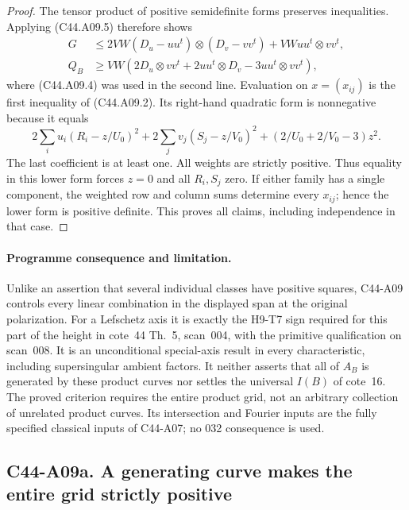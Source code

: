 \documentclass[11pt]{article}
\theoremstyle{remark}\newtheorem{remark}[theorem]{Remark}
\begin{document}
\begin{proof}
The tensor product of positive semidefinite forms preserves
inequalities. Applying (C44.A09.5) therefore shows
\[
 \begin{split}
 G&\le2VW(D_u-uu^t)\otimes(D_v-vv^t)
                           +VWuu^t\otimes vv^t,\\
 Q_B&\ge VW\left(2D_u\otimes vv^t+
                  2uu^t\otimes D_v-3uu^t\otimes vv^t\right),
 \end{split}
 \tag{C44.A09.9}
\]
where (C44.A09.4) was used in the second line. Evaluation on
$x=(x_{ij})$ is the first inequality of (C44.A09.2).
Its right-hand quadratic form is nonnegative because it equals
\[
 2\sum_i u_i(R_i-z/U_0)^2+
 2\sum_j v_j(S_j-z/V_0)^2+
       (2/U_0+2/V_0-3)z^2.
 \tag{C44.A09.10}
\]
The last coefficient is at least one. All weights are strictly
positive. Thus equality in this lower form forces $z=0$ and
all $R_i,S_j$ zero. If either family has a single component,
the weighted row and column sums determine every $x_{ij}$;
hence the lower form is positive definite. This proves all
claims, including independence in that case.
\end{proof}

\paragraph{Programme consequence and limitation.}
Unlike an assertion that several individual classes have
positive squares, C44-A09 controls every linear combination in
the displayed span at the original polarization. For a
Lefschetz axis it is exactly the H9-T7 sign required for this
part of the height in cote~44 Th.~5, scan~004, with the
primitive qualification on scan~008. It is an unconditional
special-axis result in every characteristic, including
supersingular ambient factors. It neither asserts that all of
$A_B$ is generated by these product curves nor settles the
universal $I(B)$ of cote~16. The proved criterion requires the
entire product grid, not an arbitrary collection of unrelated
product curves. Its intersection and Fourier inputs are the
fully specified classical inputs of C44-A07; no 032 consequence
is used.


\subsection*{C44-A09a. A generating curve makes the entire grid strictly positive}
\end{document}
